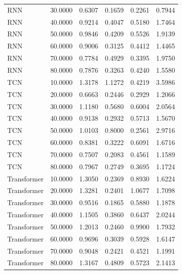 \begin{tabular}{lrrrrr}
RNN & 30.0000 & 0.6307 & 0.1659 & 0.2261 & 0.7944 \\
RNN & 40.0000 & 0.9214 & 0.4047 & 0.5180 & 1.7464 \\
RNN & 50.0000 & 0.9846 & 0.4209 & 0.5526 & 1.9139 \\
RNN & 60.0000 & 0.9006 & 0.3125 & 0.4412 & 1.4465 \\
RNN & 70.0000 & 0.7784 & 0.4929 & 0.3395 & 1.9750 \\
RNN & 80.0000 & 0.7876 & 0.3263 & 0.4240 & 1.5580 \\
TCN & 10.0000 & 1.3178 & 1.1272 & 0.4219 & 3.5986 \\
TCN & 20.0000 & 0.6663 & 0.2446 & 0.2929 & 1.2066 \\
TCN & 30.0000 & 1.1180 & 0.5680 & 0.6004 & 2.0564 \\
TCN & 40.0000 & 0.9138 & 0.2932 & 0.5713 & 1.5670 \\
TCN & 50.0000 & 1.0103 & 0.8000 & 0.2561 & 2.9716 \\
TCN & 60.0000 & 0.8381 & 0.3222 & 0.6091 & 1.6716 \\
TCN & 70.0000 & 0.7507 & 0.2083 & 0.4561 & 1.1589 \\
TCN & 80.0000 & 0.7967 & 0.2749 & 0.3695 & 1.1724 \\
Transformer & 10.0000 & 1.3050 & 0.2369 & 0.8930 & 1.6224 \\
Transformer & 20.0000 & 1.3281 & 0.2401 & 1.0677 & 1.7098 \\
Transformer & 30.0000 & 0.9516 & 0.1865 & 0.5880 & 1.1878 \\
Transformer & 40.0000 & 1.1505 & 0.3860 & 0.6437 & 2.0244 \\
Transformer & 50.0000 & 1.2013 & 0.2460 & 0.9900 & 1.7932 \\
Transformer & 60.0000 & 0.9696 & 0.3039 & 0.5928 & 1.6147 \\
Transformer & 70.0000 & 0.9048 & 0.2421 & 0.4521 & 1.1991 \\
Transformer & 80.0000 & 1.3167 & 0.4809 & 0.5723 & 2.1413 \\
\bottomrule
\end{tabular}
